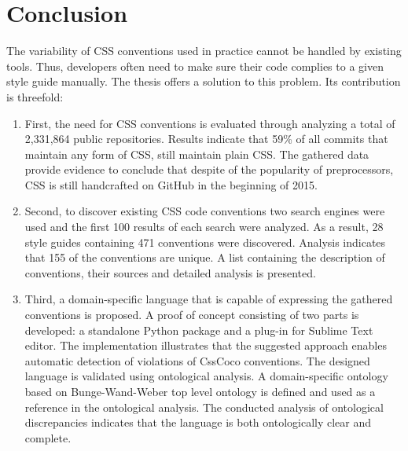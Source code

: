\chapter{Conclusion}
\label{sec:conclusion}

The variability of CSS conventions used in practice cannot be handled by
existing tools. Thus, developers often need to make sure their code complies
to a given style guide manually. The thesis offers a solution to this problem.
Its contribution is threefold:

\begin{enumerate}
	\item First, the need for CSS conventions is evaluated through analyzing a total of 2,331,864 public repositories. Results indicate that 59\% of all commits that maintain any form of CSS, still maintain plain CSS. The gathered data provide evidence to conclude that despite of the popularity of preprocessors, CSS is still handcrafted on GitHub in the beginning of 2015.
	\item Second, to discover existing CSS code conventions two search engines were used and the first 100 results of each search were analyzed. As a result, 28 style guides containing 471 conventions were discovered. Analysis indicates that 155 of the conventions are unique. A list containing the description of conventions, their sources and detailed analysis is presented. 
	\item Third, a domain-specific language that is capable of expressing the gathered conventions is proposed. A proof of concept consisting of two parts is developed: a standalone Python package and a plug-in for Sublime Text editor. The implementation illustrates that the suggested approach enables automatic detection of violations of CssCoco conventions. The designed language is validated using ontological analysis. A domain-specific ontology based on Bunge-Wand-Weber top level ontology is defined and used as a reference in the ontological analysis. The conducted analysis of ontological discrepancies indicates that the language is both ontologically clear and complete.
\end{enumerate}

